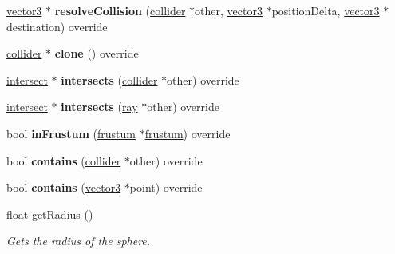 \begin{DoxyCompactItemize}
\mbox{\label{classflounder_1_1sphere_ad771d7177b2037c8515d227a1ca0c1c1}} 
\hyperlink{classflounder_1_1vector3}{vector3} $\ast$ {\bfseries resolve\+Collision} (\hyperlink{classflounder_1_1collider}{collider} $\ast$other, \hyperlink{classflounder_1_1vector3}{vector3} $\ast$position\+Delta, \hyperlink{classflounder_1_1vector3}{vector3} $\ast$destination) override
\item 
\mbox{\label{classflounder_1_1sphere_a657285e9c6288b1573bbda966c546be4}} 
\hyperlink{classflounder_1_1collider}{collider} $\ast$ {\bfseries clone} () override
\item 
\mbox{\label{classflounder_1_1sphere_a3a0c4b4c8d0c606546f291b78862cc32}} 
\hyperlink{classflounder_1_1intersect}{intersect} $\ast$ {\bfseries intersects} (\hyperlink{classflounder_1_1collider}{collider} $\ast$other) override
\item 
\mbox{\label{classflounder_1_1sphere_abc196e76cb0ae68e1dbcb6dc97333bd9}} 
\hyperlink{classflounder_1_1intersect}{intersect} $\ast$ {\bfseries intersects} (\hyperlink{classflounder_1_1ray}{ray} $\ast$other) override
\item 
\mbox{\label{classflounder_1_1sphere_af28e19dbda7f675c26082f5a5e72067e}} 
bool {\bfseries in\+Frustum} (\hyperlink{classflounder_1_1frustum}{frustum} $\ast$\hyperlink{classflounder_1_1frustum}{frustum}) override
\item 
\mbox{\label{classflounder_1_1sphere_a94fc35d2bc15e1cac2010014d60113f0}} 
bool {\bfseries contains} (\hyperlink{classflounder_1_1collider}{collider} $\ast$other) override
\item 
\mbox{\label{classflounder_1_1sphere_ae9f1394c37144cfbde053c1dfcb74da7}} 
bool {\bfseries contains} (\hyperlink{classflounder_1_1vector3}{vector3} $\ast$point) override
\item 
float \hyperlink{classflounder_1_1sphere_afb370d1ab8dc82e6bd8a59fc8cba87e7}{get\+Radius} ()
\begin{DoxyCompactList}\small\item\em Gets the radius of the sphere. \end{DoxyCompactList}\item 

\end{DoxyCompactItemize}
